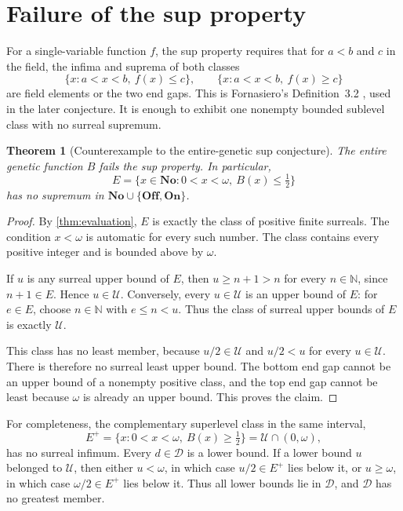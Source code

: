 \documentclass[11pt,letterpaper]{article}
\numberwithin{equation}{section}
\newtheorem{theorem}{Theorem}[section]
\theoremstyle{definition}
\theoremstyle{remark}
\newcommand{\No}{\mathbf{No}}
\newcommand{\On}{\mathbf{On}}
\newcommand{\Off}{\mathbf{Off}}
\newcommand{\N}{\mathbb{N}}
\newcommand{\U}{\mathcal{U}}
\newcommand{\D}{\mathcal{D}}
\begin{document}
\section{Failure of the sup property}\label{sec:sup}
For a single-variable function $f$, the sup property requires that for
$a<b$ and $c$ in the field, the infima and suprema of both classes
\[
 \{x:a<x<b,\ f(x)\le c\},\qquad
 \{x:a<x<b,\ f(x)\ge c\}
\]
are field elements or the two end gaps. This is Fornasiero's
Definition~3.2 \cite{Fornasiero}, used in the later conjecture.
It is enough to exhibit one nonempty bounded sublevel class with no
surreal supremum.

\begin{theorem}[Counterexample to the entire-genetic sup conjecture]\label{thm:sup}
The entire genetic function $B$ fails the sup property. In particular,
\begin{equation}\label{eq:E}
 E=\{x\in\No:0<x<\omega,\ B(x)\le\tfrac12\}
\end{equation}
has no supremum in $\No\cup\{\Off,\On\}$.
\end{theorem}
\begin{proof}
By \cref{thm:evaluation}, $E$ is exactly the class of positive finite
surreals. The condition $x<\omega$ is automatic for every such number.
The class contains every positive integer and is bounded above by $\omega$.

If $u$ is any surreal upper bound of $E$, then $u\ge n+1>n$ for every
$n\in\N$, since $n+1\in E$. Hence $u\in\U$. Conversely, every $u\in\U$
is an upper bound of $E$: for $e\in E$, choose $n\in\N$ with $e\le n<u$.
Thus the class of surreal upper bounds of $E$ is exactly $\U$.

This class has no least member, because $u/2\in\U$ and $u/2<u$ for every
$u\in\U$. There is therefore no surreal least upper bound. The bottom end
gap cannot be an upper bound of a nonempty positive class, and the top end
gap cannot be least because $\omega$ is already an upper bound. This proves
the claim.
\end{proof}

For completeness, the complementary superlevel class in the same interval,
\[
 E^+=\{x:0<x<\omega,\ B(x)\ge\tfrac12\}=\U\cap(0,\omega),
\]
has no surreal infimum. Every $d\in\D$ is a lower bound. If a lower bound
$u$ belonged to $\U$, then either $u<\omega$, in which case
$u/2\in E^+$ lies below it, or $u\ge\omega$, in which case
$\omega/2\in E^+$ lies below it. Thus all lower bounds lie in $\D$, and
$\D$ has no greatest member.
\end{document}
